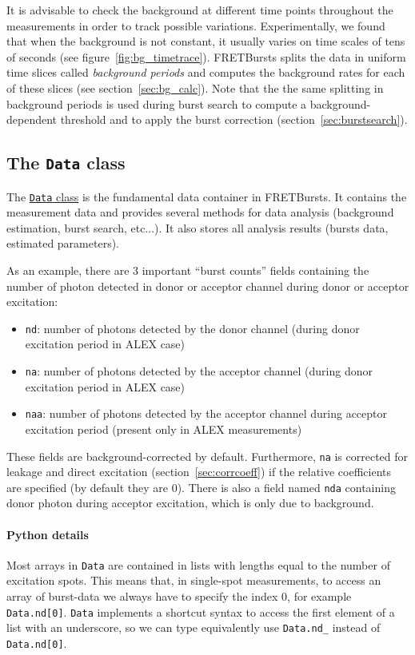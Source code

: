 It is advisable to check the background at different time points
throughout the measurements in order to track possible variations.
Experimentally, we found that when the background is not constant,
it usually varies
on time scales of tens of seconds (see figure~\ref{fig:bg_timetrace}).
FRETBursts splits the data in uniform time
slices called \textit{background periods} and computes the background rates for
each of these slices (see section~\ref{sec:bg_calc}).
Note that the the same splitting in background periods is used during
burst search to compute a background-dependent
threshold and to apply the burst correction (section~\ref{sec:burstsearch}).

\subsection{The \texttt{Data} class}
\label{sec:data_intro}

The
\href{http://fretbursts.readthedocs.org/en/latest/data_class.html}{\texttt{Data}
class} is the fundamental data container in FRETBursts. It contains the
measurement data and provides several methods for data analysis (background
estimation, burst search, etc...). It also stores all analysis results
(bursts data, estimated parameters).

As an example, there are 3 important ``burst counts'' fields containing  
the number of photon detected in donor or acceptor channel
during donor or acceptor excitation:

\begin{itemize}
\item \verb|nd|: number of photons detected by the donor channel
(during donor excitation period in ALEX case)
\item \verb|na|: number of photons detected by the acceptor channel
(during donor excitation period in ALEX case)
\item \verb|naa|: number of photons detected by the acceptor channel
during acceptor excitation period (present only in ALEX measurements)
\end{itemize}

These fields are background-corrected by default. Furthermore,
\verb|na| is corrected for leakage and direct excitation 
(section~\ref{sec:corrcoeff}) if the relative coefficients are specified 
(by default they are 0).
There is also a field named \verb|nda| containing donor photon during 
acceptor excitation, which is only due to background.

\paragraph{Python details}
Most arrays in \texttt{Data} are contained in lists with lengths equal to the
number of excitation spots. This means that, in
single-spot measurements, to access an array of burst-data
we always have to specify the index 0, for example \verb|Data.nd[0]|.
\verb|Data| implements a shortcut syntax to access the first element of a list
with an underscore, so we can type equivalently use
\verb|Data.nd_| instead of \verb|Data.nd[0]|.

